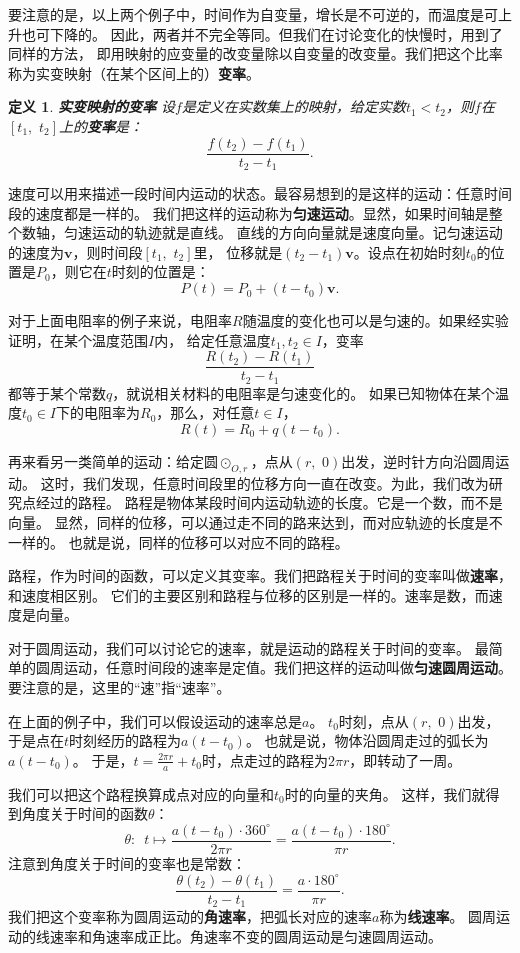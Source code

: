\documentclass[12pt,UTF8]{ctexbook}
\newtheorem{df}{定义}[section]
\begin{document}
要注意的是，以上两个例子中，时间作为自变量，增长是不可逆的，而温度是可上升也可下降的。
因此，两者并不完全等同。但我们在讨论变化的快慢时，用到了同样的方法，
即用映射的应变量的改变量除以自变量的改变量。我们把这个比率称为实变映射（在某个区间上的）\textbf{变率}。

\begin{df}{\textbf{实变映射的变率}}
    设$f$是定义在实数集上的映射，给定实数$t_1 < t_2$，则$f$在$[t_1,\,\,t_2]$上的\textbf{变率}是：
    $$ \frac{f(t_2) - f(t_1)}{t_2 - t_1}.$$
\end{df}

速度可以用来描述一段时间内运动的状态。最容易想到的是这样的运动：任意时间段的速度都是一样的。
我们把这样的运动称为\textbf{匀速运动}。显然，如果时间轴是整个数轴，匀速运动的轨迹就是直线。
直线的方向向量就是速度向量。记匀速运动的速度为$\mathbf{v}$，则时间段$[t_1,\,\,t_2]$里，
位移就是$(t_2 - t_1)\mathbf{v}$。设点在初始时刻$t_0$的位置是$P_0$，则它在$t$时刻的位置是：
$$P(t) = P_0 + (t - t_0)\mathbf{v}.$$

对于上面电阻率的例子来说，电阻率$R$随温度的变化也可以是匀速的。如果经实验证明，在某个温度范围$I$内，
给定任意温度$t_1, t_2 \in I$，变率
$$ \frac{R(t_2) - R(t_1)}{t_2 - t_1} $$
都等于某个常数$q$，就说相关材料的电阻率是匀速变化的。
如果已知物体在某个温度$t_0\in I$下的电阻率为$R_0$，那么，对任意$t\in I$，
$$ R(t) = R_0 + q(t - t_0). $$

再来看另一类简单的运动：给定圆$\odot_{O, r}$，点从$(r,\,\, 0)$出发，逆时针方向沿圆周运动。
这时，我们发现，任意时间段里的位移方向一直在改变。为此，我们改为研究点经过的路程。
路程是物体某段时间内运动轨迹的长度。它是一个数，而不是向量。
显然，同样的位移，可以通过走不同的路来达到，而对应轨迹的长度是不一样的。
也就是说，同样的位移可以对应不同的路程。

路程，作为时间的函数，可以定义其变率。我们把路程关于时间的变率叫做\textbf{速率}，和速度相区别。
它们的主要区别和路程与位移的区别是一样的。速率是数，而速度是向量。

对于圆周运动，我们可以讨论它的速率，就是运动的路程关于时间的变率。
最简单的圆周运动，任意时间段的速率是定值。我们把这样的运动叫做\textbf{匀速圆周运动}。
要注意的是，这里的“速”指“速率”。

在上面的例子中，我们可以假设运动的速率总是$a$。
$t_0$时刻，点从$(r,\,\, 0)$出发，于是点在$t$时刻经历的路程为$a(t - t_0)$。
也就是说，物体沿圆周走过的弧长为$a(t - t_0)$。
于是，$t = \frac{2\pi r}{a} + t_0$时，点走过的路程为$2\pi r$，即转动了一周。

我们可以把这个路程换算成点对应的向量和$t_0$时的向量的夹角。
这样，我们就得到角度关于时间的函数$\theta$：
$$ \theta : \,\,\, t \mapsto \frac{a(t - t_0)\cdot 360^\circ}{2\pi r} = \frac{a(t - t_0)\cdot 180^\circ}{\pi r}.$$
注意到角度关于时间的变率也是常数：
$$ \frac{\theta(t_2) - \theta(t_1)}{t_2 - t_1} = \frac{a \cdot 180^\circ}{\pi r}.$$
我们把这个变率称为圆周运动的\textbf{角速率}，把弧长对应的速率$a$称为\textbf{线速率}。
圆周运动的线速率和角速率成正比。角速率不变的圆周运动是匀速圆周运动。
\end{document}
